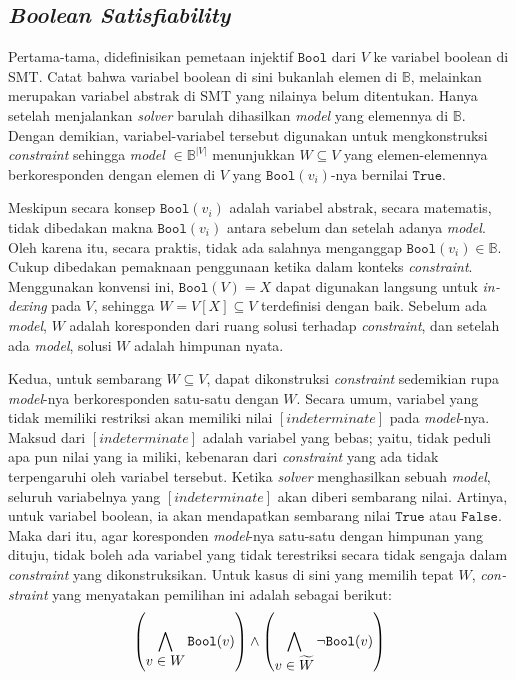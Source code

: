 \documentclass[10pt,twocolumn]{article}
\newcommand{\foreign}[1]{\foreignlanguage{english}{\textit{#1}}}
\def\True{\mathtt{True}}
\def\False{\mathtt{False}}
\def\Bbb{\mathbb{B}}
\def\boolmap{\mathtt{Bool}}
\newcommand{\combine}[7]{#1 #2 \vphantom{#6} #3 #4 #5 #6 \vphantom{#2} #7}
\def\indeterminate{\mathit{[indeterminate]}}
\begin{document}
\subsection{\foreign{Boolean Satisfiability}}
\label{subsec:bs}

Pertama-tama, didefinisikan pemetaan injektif \(\boolmap\) dari \(V\) ke variabel boolean di SMT. Catat bahwa variabel boolean di sini bukanlah elemen di \(\Bbb\), melainkan merupakan variabel abstrak di SMT yang nilainya belum ditentukan. Hanya setelah menjalankan \foreign{solver} barulah dihasilkan \foreign{model} yang elemennya di \(\Bbb\). Dengan demikian, variabel-variabel tersebut digunakan untuk mengkonstruksi \foreign{constraint} sehingga \foreign{model} \(\in \Bbb^{|V|}\) menunjukkan \(W \subseteq V\) yang elemen-elemennya berkoresponden dengan elemen di \(V\) yang \(\boolmap(v_i)\)-nya bernilai \(\True\).

Meskipun secara konsep \(\boolmap(v_i)\) adalah variabel abstrak, secara matematis, tidak dibedakan makna \(\boolmap(v_i)\) antara sebelum dan setelah adanya \foreign{model}. Oleh karena itu, secara praktis, tidak ada salahnya menganggap \(\boolmap(v_i) \in \Bbb\). Cukup dibedakan pemaknaan penggunaan ketika dalam konteks \foreign{constraint}. Menggunakan konvensi ini, \(\boolmap(V) = X\) dapat digunakan langsung untuk \foreign{indexing} pada \(V\), sehingga \(W = V[X] \subseteq V\) terdefinisi dengan baik. Sebelum ada \foreign{model}, \(W\) adalah koresponden dari ruang solusi terhadap \foreign{constraint}, dan setelah ada \foreign{model}, solusi \(W\) adalah himpunan nyata.

Kedua, untuk sembarang \(W \subseteq V\), dapat dikonstruksi \foreign{constraint} sedemikian rupa \foreign{model}-nya berkoresponden satu-satu dengan \(W\). Secara umum, variabel yang tidak memiliki restriksi akan memiliki nilai \(\indeterminate\) pada \foreign{model}-nya. Maksud dari \(\indeterminate\) adalah variabel yang bebas; yaitu, tidak peduli apa pun nilai yang ia miliki, kebenaran dari \foreign{constraint} yang ada tidak terpengaruhi oleh variabel tersebut. Ketika \foreign{solver} menghasilkan sebuah \foreign{model}, seluruh variabelnya yang \(\indeterminate\) akan diberi sembarang nilai. Artinya, untuk variabel boolean, ia akan mendapatkan sembarang nilai \(\True\) atau \(\False\). Maka dari itu, agar koresponden \foreign{model}-nya satu-satu dengan himpunan yang dituju, tidak boleh ada variabel yang tidak terestriksi secara tidak sengaja dalam \foreign{constraint} yang dikonstruksikan. Untuk kasus di sini yang memilih tepat \(W\), \foreign{constraint} yang menyatakan pemilihan ini adalah sebagai berikut:
\[
	\combine{\left(}
			{\bigwedge \limits_{\displaystyle v \in W} \boolmap(v)}
	{\right)}{\wedge}{\left(}
			{\bigwedge \limits_{\displaystyle v \in \widetilde{W}} \neg \boolmap(v)}
	{\right)}
\]
\end{document}
